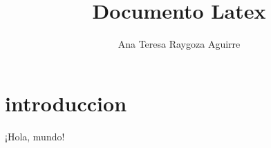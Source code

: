\documentclass{article}
\title{Documento Latex}
\author{Ana Teresa Raygoza Aguirre}
\begin{document}
\section{introduccion}

  ¡Hola, mundo!
\end{document}

